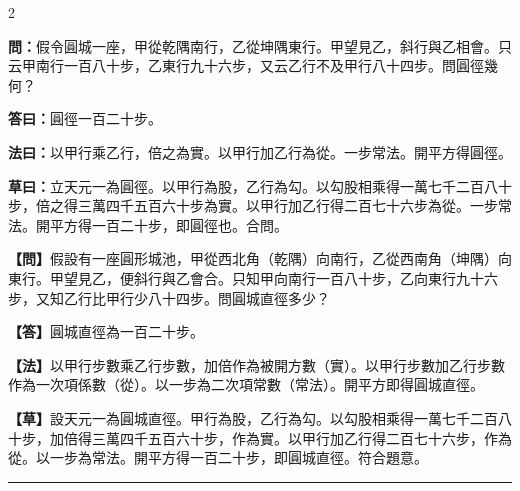 \documentclass[11pt,a4paper]{article}
\newcommand{\longline}{\noindent\rule{\textwidth}{0.4pt}}
\newcommand{\wenC}[1]{\par\noindent\textbf{\textcolor{probcolor}{問：}}{#1}\par}
\newcommand{\daC}[1]{\par\noindent\textbf{\textcolor{anscolor}{答曰：}}{#1}\par}
\newcommand{\fayueC}[1]{\par\noindent\textbf{\textcolor{methodcolor}{法曰：}}{#1}\par}
\newcommand{\caoyueC}[1]{\par\noindent\textbf{草曰：}{#1}\par}
\newcommand{\wenM}[1]{\par\noindent\textbf{\textcolor{probcolor}{【問】}}{#1}\par}
\newcommand{\daM}[1]{\par\noindent\textbf{\textcolor{anscolor}{【答】}}{#1}\par}
\newcommand{\fayueM}[1]{\par\noindent\textbf{\textcolor{methodcolor}{【法】}}{#1}\par}
\newcommand{\caoyueM}[1]{\par\noindent\textbf{【草】}{#1}\par}
\begin{document}
\begin{paracol}{2}

\wenC{假令圓城一座，甲從乾隅南行，乙從坤隅東行。甲望見乙，斜行與乙相會。只云甲南行一百八十步，乙東行九十六步，又云乙行不及甲行八十四步。問圓徑幾何？}

\daC{圓徑一百二十步。}

\fayueC{以甲行乘乙行，倍之為實。以甲行加乙行為從。一步常法。開平方得圓徑。}

\caoyueC{立天元一為圓徑。以甲行為股，乙行為勾。以勾股相乘得一萬七千二百八十步，倍之得三萬四千五百六十步為實。以甲行加乙行得二百七十六步為從。一步常法。開平方得一百二十步，即圓徑也。合問。}

\switchcolumn

\wenM{假設有一座圓形城池，甲從西北角（乾隅）向南行，乙從西南角（坤隅）向東行。甲望見乙，便斜行與乙會合。只知甲向南行一百八十步，乙向東行九十六步，又知乙行比甲行少八十四步。問圓城直徑多少？}

\daM{圓城直徑為一百二十步。}

\fayueM{以甲行步數乘乙行步數，加倍作為被開方數（實）。以甲行步數加乙行步數作為一次項係數（從）。以一步為二次項常數（常法）。開平方即得圓城直徑。}

\caoyueM{設天元一為圓城直徑。甲行為股，乙行為勾。以勾股相乘得一萬七千二百八十步，加倍得三萬四千五百六十步，作為實。以甲行加乙行得二百七十六步，作為從。以一步為常法。開平方得一百二十步，即圓城直徑。符合題意。}

\end{paracol}

\vspace{0.3cm}
\longline
\end{document}
